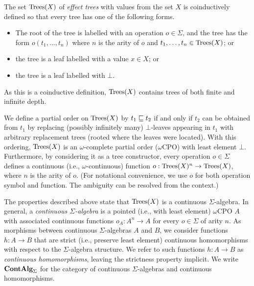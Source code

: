 \begin{definition}
The set $\textnormal{Trees}(X)$ of \emph{effect trees} with values from  the set $X$ is coinductively defined so that
every tree has one of the following  forms.
\begin{itemize}
\item The root of the tree is labelled with an operation $o \in \Sigma$, and the tree has the form
         $o(t_1, \dots, t_n)$ where $n$ is the arity of $o$ and $t_1, \dots, t_n \in \textnormal{Trees}(X)$; or
\item the tree is a leaf labelled with a value $x \in X$; or
\item the tree is a leaf labelled with $\bot$.
\end{itemize}
\end{definition}
As this is a coinductive definition, $\textnormal{Trees}(X)$ contains trees of both finite and infinite depth.

We define a partial order on  $\textnormal{Trees}(X)$ by
$t_1 \sqsubseteq t_2$ if and only if $t_2$ can be obtained from $t_1$ by replacing (possibly infinitely many)
$\bot$-leaves appearing in $t_1$ with arbitrary replacement trees (rooted where the leaves were located). With this ordering,  $\textnormal{Trees}(X)$  is an $\omega$-complete 
partial order ($\omega$CPO) with least element $\bot$. Furthermore, by considering it as
a tree constructor,
every operation $o \in \Sigma$  defines a continuous (i.e., $\omega$-continuous) function $o : \textnormal{Trees}(X)^n \to \textnormal{Trees}(X)$, where $n$ is the arity of $o$.
(For notational convenience, we use $o$ for both operation symbol and function. The ambiguity can be resolved from the context.) 

The properties described above state that $\textnormal{Trees}(X)$ is a continuous $\Sigma$-algebra. In general,
a \emph{continuous $\Sigma$-algebra} is a pointed (i.e., with least element) $\omega$CPO $A$ with associated
continuous functions $o_A : A^n \to A$ for every $o \in \Sigma$ of arity $n$. 
As morphisms between continuous $\Sigma$-algebras
$A$ and $B$, we consider functions $h: A \to B$  that are strict (i.e., preserve least element) continuous homomorphisms with respect to the $\Sigma$-algebra structure. 
We refer to such  functions $h: A \to B$ as \emph{continuous homomorphisms}, leaving the strictness property implicit.
We write $\mathbf{ContAlg}_\Sigma$ for the category of continuous $\Sigma$-algebras and continuous homomorphisms.

